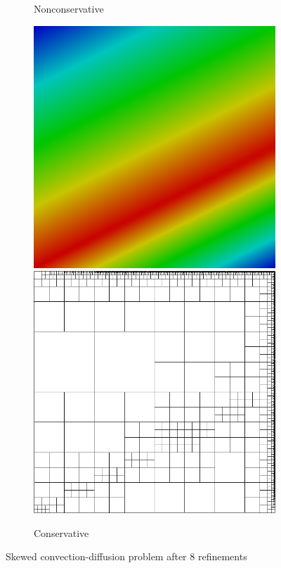 \documentclass[letterpaper]{article}
\begin{document}
\begin{figure}[p]
\begin{subfigure}[t]{0.45\textwidth}
\caption{Nonconservative}
\label{fig:confusionModified8nc}
\end{subfigure}
\begin{subfigure}[t]{0.45\textwidth}
\centering
\includegraphics[width=\textwidth]{figs/Confusion/modified8c.png}
\includegraphics[width=\textwidth]{figs/Confusion/modified8c_mesh.png}
\caption{Conservative}
\label{fig:confusionModified8c}
\end{subfigure}
\caption{Skewed convection-diffusion problem after 8 refinements}
\label{fig:confusion}
\end{figure}
\end{document}
